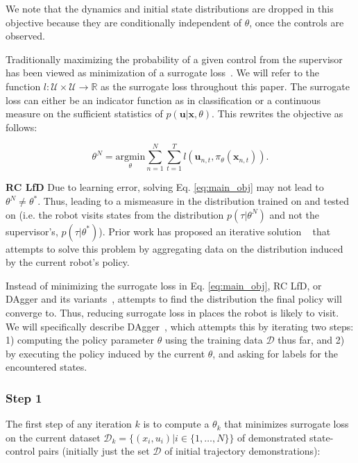 \documentclass[10pt, conference]{ieeeconf}      %
\newcommand{\bu}{\mathbf{u}}
\newcommand{\bx}{\mathbf{x}}
\newcommand{\nc}{RC LfD }
\begin{document}
We note that the dynamics and initial state distributions are dropped in this objective because they are conditionally independent of $\theta$, once the controls are observed. 

 Traditionally maximizing the probability of a given control  from the supervisor has been viewed as minimization of a surrogate loss~\cite{ross2010reduction,ross2010efficient}. We will refer to the function $l : \mathcal{U} \times \mathcal{U} \rightarrow \mathbb{R}$ as the surrogate loss throughout this paper. The surrogate loss can either be an indicator function as in classification or a continuous measure on the sufficient statistics of $p(\bu|\bx,\theta)$.  This rewrites the objective as follows: 

\begin{equation}\label{eq:main_obj}
\theta^N = \underset{\theta}{\mbox{argmin}} \sum^N_{n=1}\sum^T_{t=1} l(\bu_{n,t}, \pi_{\theta} (\bx_{n,t})).
\end{equation}


\noindent \textbf{\nc} Due to learning error, solving Eq. \ref{eq:main_obj} may not lead to $\theta^N \neq \theta^*$.  Thus, leading to a mismeasure in the distribution trained on and tested on (i.e. the robot visits states from the distribution $p(\tau|\theta^N)$ and not the supervisor's, $p(\tau|\theta^*)$).  Prior work has proposed an iterative solution ~\cite{ross2010reduction} that attempts to solve this problem by aggregating data on the distribution induced by the current robot's policy.

Instead of  minimizing the surrogate loss in Eq. \ref{eq:main_obj},  RC LfD, or DAgger and its variants~\cite{ross2010reduction,laskeyshiv,he2012imitation}, attempts to find the distribution the final policy will converge to. Thus, reducing surrogate loss in places the robot is likely to visit.
We will specifically describe DAgger~\cite{ross2010reduction}, which attempts this by iterating two steps: 1)
computing the policy parameter $\theta$ using the training data $\mathcal{D}$ thus far, and 2) by executing the policy
induced by the current $\theta$, and asking for labels for the encountered states. 
 
\subsubsection{Step 1}
The first step of any iteration $k$ is to compute a $\theta_k$ that minimizes surrogate loss on the current dataset $\mathcal{D}_k=\{(x_i,u_i)|i\in\{1,\ldots,N\}\}$ of demonstrated state-control pairs (initially just the set $\mathcal{D}$ of initial trajectory demonstrations):
\end{document}
